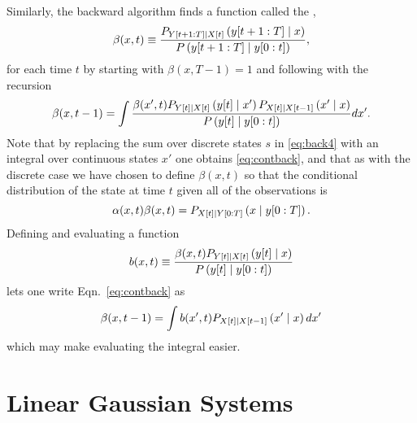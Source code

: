 Similarly, the backward algorithm finds a function called the
,
\begin{equation}
  \label{eq:contbeta}
  \beta(x,t) \equiv \frac{P_{Y[t+1:T]\mid {X}{[t]}}
  \left(y[t+1:T]\mid x \right)}{P\left(y[t+1:T]\mid y[0:t]
               \right)},
\end{equation}
for each time $t$ by starting with $\beta(x,T-1) = 1$ and following with
the recursion
\begin{equation}
  \label{eq:contback}
  \beta(x,t-1) = \int 
  \frac{\beta(x',t) P_{{Y}{[t]}\mid {X}{[t]}}\left({y}{[t]}\mid x' \right)
  P_{{X}{[t]}\mid {X}{[t-1]}}\left(x'\mid x \right)}
  {P\left({y}{[t]}\mid y[0:t] \right)} dx'.
\end{equation}
Note that by replacing the sum over discrete states $s$ in
\eqref{eq:back4} with an integral over continuous states $x'$ one
obtains \eqref{eq:contback}, and that as with the discrete case we
have chosen to define $\beta(x,t)$ so that the conditional
distribution of the state at time $t$ given all of the observations is
\begin{equation}
  \label{eq:contalphabeta}
  \alpha(x,t) \beta(x,t) = P_{{X}{[t]}\mid Y[0:T]}
  \left(x\mid y[0:T] \right).
\end{equation}
Defining and evaluating a \emph{} function
\begin{equation}
  \label{eq:bdef}
  b(x,t) \equiv \frac{\beta(x,t)
    P_{{Y}{[t]}\mid {X}{[t]}}\left({y}{[t]}\mid x
    \right)} {P\left({y}{[t]}\mid y[0:t] \right)}
\end{equation}
lets one write Eqn.~\eqref{eq:contback} as
\begin{equation*}
  \beta(x,t-1) = \int b(x',t) P_{{X}{[t]}\mid {X}{[t-1]}}\left(x'\mid x
  \right) dx'
\end{equation*}
which may make evaluating the integral easier.

\section{Linear Gaussian Systems}
\label{sec:LinearGaussian}

